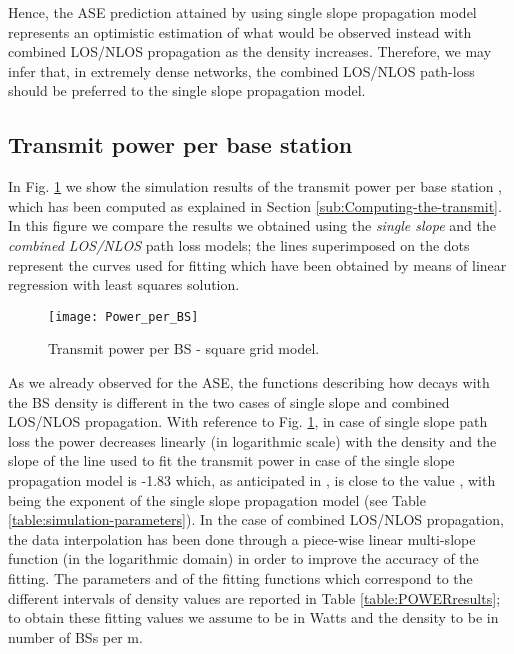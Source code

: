 \documentclass[twocoumn]{IEEEtran}
\begin{document}
Hence, the ASE prediction attained by using single slope propagation
model represents an optimistic estimation of what would be observed
instead with combined LOS/NLOS propagation as the density increases. Therefore, we may infer that, in extremely dense networks, the combined LOS/NLOS path-loss should be preferred to the single slope propagation model.


\subsection{Transmit power per base station}\label{sub:TXPowerPerBS}

In Fig. \ref{fig:transmit_power} we show the simulation results of
the transmit power per base station , which has been computed as explained in Section
\ref{sub:Computing-the-transmit}. In this figure we compare the results
we obtained using the \textit{single slope} and the \textit{combined LOS/NLOS}
path loss models; the lines superimposed on the dots represent the
curves used for fitting which have been obtained by means
of linear regression with least squares solution.

\begin{figure}
\centering
\texttt{[image: Power\_per\_BS]}
\caption{Transmit power per BS - square grid model.}\label{fig:transmit_power}
\vspace{-4mm}
\end{figure}

As we already observed for the ASE, the functions describing how  decays with the BS density  is different in the two cases of single slope and combined LOS/NLOS propagation. With reference to Fig. \ref{fig:transmit_power}, in case of single slope path loss the power decreases linearly (in logarithmic scale) with the density and 
the slope of the
line used to fit the transmit power in case of the single slope propagation
model is -1.83 which, as anticipated in \cite{Galiotto2013}, is
close to the value , with  being the exponent
of the single slope propagation model (see Table \eqref{table:simulation-parameters}).
In the case of combined LOS/NLOS propagation, the data interpolation
has been done through a piece-wise linear multi-slope function (in
the logarithmic domain) in order to improve the accuracy of the fitting.
The parameters
 and  of the fitting functions  which correspond to the different
intervals of density values  are reported in Table \ref{table:POWERresults}; to obtain these fitting values we assume   to be in Watts and the density  to be in number of BSs per m.
\end{document}
